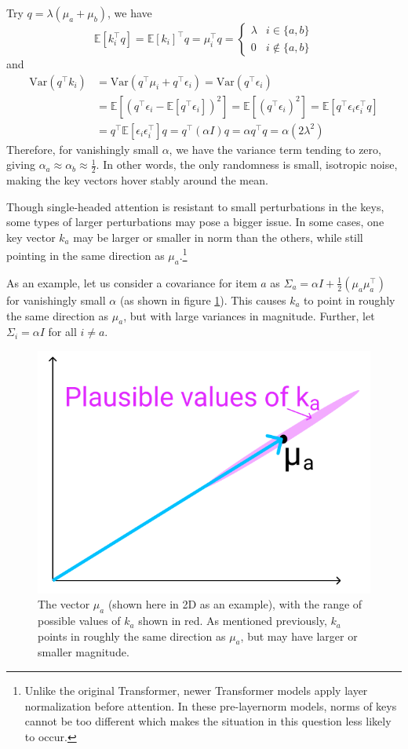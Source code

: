 \begin{parts}
\begin{subparts}
{Try $q=\lambda(\mu_a+\mu_b)$, we have 
\begin{equation*}
    \mathbb{E}[k_i^{\top}q]=\mathbb{E}[k_i]^{\top}q= \mu_i^\top q = \begin{cases}
        \lambda & i \in \{a,b\}\\
        0 & i \notin \{a,b\} 
    \end{cases}
\end{equation*}
and 
\begin{align*}
    \text{Var}(q^{\top}k_i) &= \text{Var}(q^\top \mu_i+q^\top \epsilon_i)=\text{Var}(q^\top \epsilon_i) \\
    &= \mathbb{E}[(q^\top \epsilon_i- \mathbb{E}[q^\top \epsilon_i])^2] = \mathbb{E}[(q^\top \epsilon_i)^2] = \mathbb{E}[q^\top \epsilon_i\epsilon_i^{\top}q] \\
    &= q^\top \mathbb{E}[\epsilon_i\epsilon_i^\top]q = q^\top(\alpha I)q = \alpha q^\top q = \alpha(2\lambda^2)
\end{align*}
Therefore, for vanishingly small $\alpha$, we have the variance term tending to zero, giving $\alpha_a \approx \alpha_b \approx \frac{1}{2}$. In other words, the only randomness is small, isotropic noise, making the key vectors hover stably around the mean. 
}

\subpart[3] Though single-headed attention is resistant to small perturbations in the keys, some types of larger perturbations may pose a bigger issue. In some cases, one key vector $k_a$ may be larger or smaller in norm than the others, while still pointing in the same direction as $\mu_a$.\footnote{Unlike the original Transformer, newer Transformer models apply layer normalization before attention. In these pre-layernorm models, norms of keys cannot be too different which makes the situation in this question less likely to occur.}

As an example, let us consider a covariance for item $a$ as $\Sigma_a = \alpha I + \frac{1}{2}(\mu_a\mu_a^\top)$ for vanishingly small $\alpha$ (as shown in figure \ref{ka_plausible}). This causes $k_a$ to point in roughly the same direction as $\mu_a$, but with large variances in magnitude. Further, let $\Sigma_i = \alpha I$ for all $i \neq a$.
\begin{figure}[h]
\centering
\captionsetup{justification=centering,margin=2cm}
\includegraphics[width=0.35\linewidth]{images/ka_plausible.png}
\caption{The vector $\mu_a$ (shown here in 2D as an example), with the range of possible values of $k_a$ shown in red. As mentioned previously, $k_a$ points in roughly the same direction as $\mu_a$, but may have larger or smaller magnitude.}
\label{ka_plausible}
\end{figure}


\end{subparts}
\end{parts}
